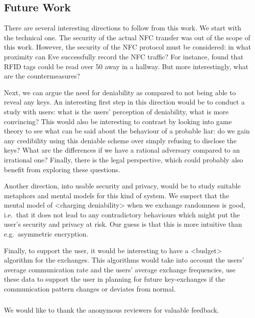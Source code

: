 \subsection{Future Work}

There are several interesting directions to follow from this work.
We start with the technical one.
The security of the actual \ac{NFC} transfer was out of the scope of this work.
However, the security of the \ac{NFC} protocol must be considered: in what 
proximity can Eve successfully record the \ac{NFC} traffic?
For instance, \citet{RFIDProximity} found that RFID tags could be read over 
\unit{50}{\metre} away in a hallway.
But more interestingly, what are the countermeasures?

Next, we can argue the need for deniability as compared to not being able to 
reveal any keys.
An interesting first step in this direction would be to conduct a study with 
users: what is the users' perception of deniability, what is more convincing?
This would also be interesting to contrast by looking into game theory to see 
what can be said about the behaviour of a probable liar: do we gain any 
credibility using this deniable scheme over simply refusing to disclose the 
keys?
What are the differences if we have a rational adversary compared to an 
irrational one?
Finally, there is the legal perspective, which could probably also benefit from 
exploring these questions.

Another direction, into usable security and privacy, would be to study suitable 
metaphors and mental models for this kind of system.
We suspect that the mental model of <charging deniability> when we exchange 
randomness is good, i.e.~that it does not lead to any contradictory behaviours 
which might put the user's security and privacy at risk.
Our guess is that this is more intuitive than e.g.~asymmetric encryption.

Finally, to support the user, it would be interesting to have a <budget> 
algorithm for the exchanges.
This algorithms would take into account the users' average communication rate 
and the users' average exchange frequencies, use these data to support the user 
in planning for future key-exchanges if the communication pattern changes or 
deviates from normal.


\subsubsection*{\ackname}

We would like to thank the anonymous reviewers for valuable feedback.


\printbibliography{}

